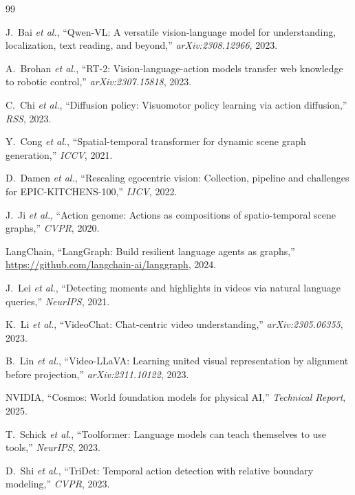\documentclass[10pt,twocolumn]{article}
\newcommand{\etal}{\textit{et al.}}
\begin{document}

\begin{thebibliography}{99}

J.~Bai \etal,
``Qwen-VL: A versatile vision-language model for understanding,
localization, text reading, and beyond,''
\emph{arXiv:2308.12966}, 2023.

A.~Brohan \etal,
``RT-2: Vision-language-action models transfer web knowledge to
robotic control,''
\emph{arXiv:2307.15818}, 2023.

C.~Chi \etal,
``Diffusion policy: Visuomotor policy learning via action
diffusion,''
\emph{RSS}, 2023.

Y.~Cong \etal,
``Spatial-temporal transformer for dynamic scene graph
generation,''
\emph{ICCV}, 2021.

D.~Damen \etal,
``Rescaling egocentric vision: Collection, pipeline and
challenges for EPIC-KITCHENS-100,''
\emph{IJCV}, 2022.

J.~Ji \etal,
``Action genome: Actions as compositions of spatio-temporal
scene graphs,''
\emph{CVPR}, 2020.

LangChain,
``LangGraph: Build resilient language agents as graphs,''
\url{https://github.com/langchain-ai/langgraph}, 2024.

J.~Lei \etal,
``Detecting moments and highlights in videos via natural language
queries,''
\emph{NeurIPS}, 2021.

K.~Li \etal,
``VideoChat: Chat-centric video understanding,''
\emph{arXiv:2305.06355}, 2023.

B.~Lin \etal,
``Video-LLaVA: Learning united visual representation by
alignment before projection,''
\emph{arXiv:2311.10122}, 2023.

NVIDIA,
``Cosmos: World foundation models for physical AI,''
\emph{Technical Report}, 2025.

T.~Schick \etal,
``Toolformer: Language models can teach themselves to use
tools,''
\emph{NeurIPS}, 2023.

D.~Shi \etal,
``TriDet: Temporal action detection with relative boundary
modeling,''
\emph{CVPR}, 2023.


\end{thebibliography}
\end{document}
